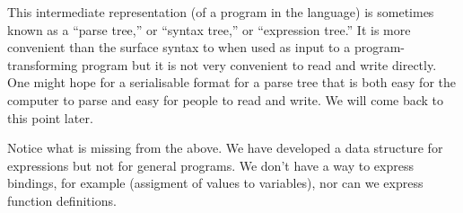 \documentclass[11pt, a4paper]{article}
\begin{document}
This intermediate representation (of a program in the language) is
sometimes known as a ``parse tree,'' or ``syntax tree,'' or
``expression tree.'' It is more convenient than the surface syntax to
when used as input to a program-transforming program but it is not
very convenient to read and write directly. One might hope for a
serialisable format for a parse tree that is both easy for the
computer to parse and easy for people to read and write. We will come
back to this point later.

Notice what is missing from the above. We have developed a data
structure for expressions but not for general programs. We don't have
a way to express bindings, for example (assigment of values to
variables), nor can we express function definitions.
\end{document}
